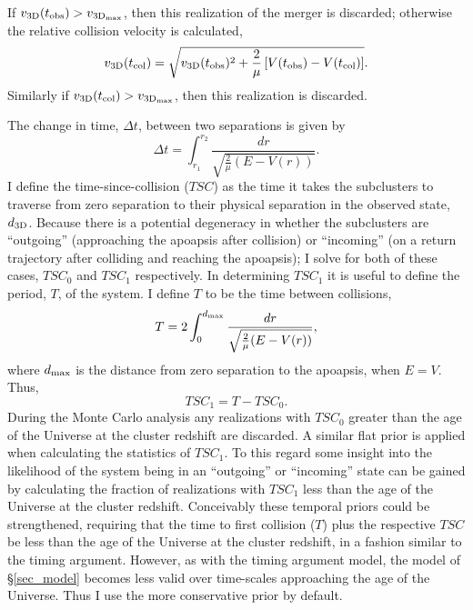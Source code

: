 If $v_{\rm 3D}(t_{\rm obs}) > v_{\rm 3D_{max}}$, then this realization of the merger is discarded; otherwise the relative collision velocity is calculated,
\begin{equation}
v_{\rm 3D}(t_{\rm col}) = \sqrt{v_{\rm 3D}(t_{\rm obs})^2+\frac{2}{\mu}\left[V(t_{\rm obs})-V(t_{\rm col})\right]}.
\label{eq_v3Dcol}
\end{equation}
Similarly if $v_{\rm 3D}(t_{\rm col}) >v_{\rm 3D_{max}}$, then this realization is discarded.

The change in time, $\Delta t$, between two separations is given by
\begin{equation}
\Delta t = \int_{r_1}^{r_2} \frac{dr}{\sqrt{\frac{2}{\mu}(E-V(r))}}.
\label{eq_deltat}
\end{equation}
I define the time-since-collision ($TSC$) as the time it takes the subclusters to traverse from zero separation to their physical separation in the observed state, $d_{\rm 3D}$. 
Because there is a potential degeneracy in whether the subclusters are ``outgoing'' (approaching the apoapsis after collision)  or ``incoming'' (on a return trajectory after colliding and reaching the apoapsis); I solve for both of these cases, $TSC_0$ and $TSC_1$ respectively.
In determining $TSC_1$ it is useful to define the period, $T$, of the system.  I define $T$ to be the time between collisions,
\begin{displaymath}
T  = 2 \int_{0}^{d_{\rm max}} \frac{dr}{\sqrt{\frac{2}{\mu}(E-V(r))}},
\end{displaymath}
where $d_{\rm max}$ is the distance from zero separation to the apoapsis, when $E=V$.
Thus,
\begin{displaymath}
TSC_1 = T - TSC_0.
\end{displaymath}
During the Monte Carlo analysis any realizations with $TSC_0$ greater than the age of the Universe at the cluster redshift are discarded.
A similar flat prior is applied when calculating the statistics of $TSC_1$.
To this regard some insight into the likelihood of the system being in an ``outgoing'' or ``incoming'' state can be gained by calculating the fraction of realizations with $TSC_1$ less than the age of the Universe at the cluster redshift.
Conceivably these temporal priors could be strengthened, requiring that the time to first collision ($T$) plus the respective $TSC$ be less than the age of the Universe at the cluster redshift, in a fashion similar to the timing argument.
However, as with the timing argument model, the model of \S\ref{sec_model} becomes less valid over time-scales approaching the age of the Universe.
Thus I use the more conservative prior by default.

